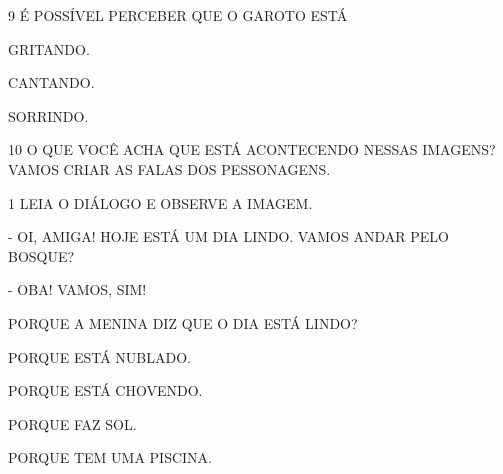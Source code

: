 \num{9} É POSSÍVEL PERCEBER QUE O GAROTO ESTÁ

\begin{boxlist}
\boxitem[X] GRITANDO. 

\boxitem[] CANTANDO.

\boxitem[] SORRINDO.
\end{boxlist}

\num{10} O QUE VOCÊ ACHA QUE ESTÁ ACONTECENDO NESSAS IMAGENS? VAMOS CRIAR AS FALAS DOS PESSONAGENS.





\num{1} LEIA O DIÁLOGO E OBSERVE A IMAGEM.


- OI, AMIGA! HOJE ESTÁ UM DIA LINDO. VAMOS ANDAR PELO BOSQUE?

- OBA! VAMOS, SIM!

PORQUE A MENINA DIZ QUE O DIA ESTÁ LINDO? 

\begin{escolha}
\item PORQUE ESTÁ NUBLADO.

\item PORQUE ESTÁ CHOVENDO.

\item PORQUE FAZ SOL.

\item  PORQUE TEM UMA PISCINA.
\end{escolha}


